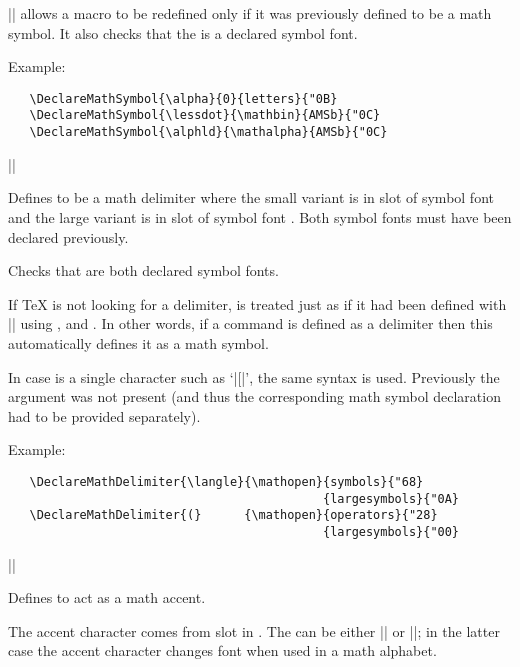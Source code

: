 \documentclass{ltxguide}[1995/11/28]
\begin{document}
|\DeclareMathSymbol| allows a macro  to be redefined only if
it was previously defined to be a math symbol.  It also checks that the
 is a declared symbol font.

Example:
\begin{verbatim}
   \DeclareMathSymbol{\alpha}{0}{letters}{"0B}
   \DeclareMathSymbol{\lessdot}{\mathbin}{AMSb}{"0C}
   \DeclareMathSymbol{\alphld}{\mathalpha}{AMSb}{"0C}
\end{verbatim}

\begin{decl}
  |\DeclareMathDelimiter|  
                           \\
              \null\hfill {} 
\end{decl}
Defines  to be a math delimiter where the small variant is in
slot  of symbol font  and the large variant is
in slot  of symbol font .  Both symbol fonts
must have been declared previously.

Checks that  are both declared symbol fonts.

If \TeX{} is not looking for a delimiter,  is treated just as if
it had been defined with |\DeclareMathSymbol| using ,
 and .  In other words, if a command is defined
as a delimiter then this automatically defines it as a math symbol.

In case  is a single character such as `|[|', the same syntax is
used.  Previously the  argument was not present (and thus the
corresponding math symbol declaration had to be provided separately).

Example:
\begin{verbatim}
   \DeclareMathDelimiter{\langle}{\mathopen}{symbols}{"68}
                                            {largesymbols}{"0A}
   \DeclareMathDelimiter{(}      {\mathopen}{operators}{"28}
                                            {largesymbols}{"00}
\end{verbatim}


\begin{decl}
  |\DeclareMathAccent|    
\end{decl}

Defines  to act as a math accent.

The accent character comes from slot  in . The
 can be either |\mathord| or |\mathalpha|; in the latter case
the accent character changes font when used in a math alphabet.
\end{document}
